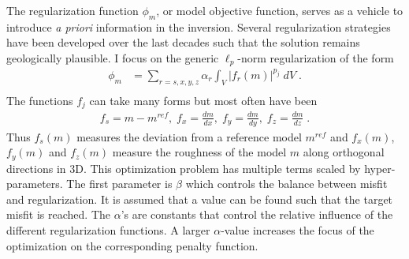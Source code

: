 The regularization function $\phi_m$, or model objective function, serves as a vehicle to introduce \emph{a priori} information in the inversion.
Several regularization strategies have been developed over the last decades such that the solution remains geologically plausible.
I focus on the generic $\ell_p$-norm regularization of the form
\begin{equation}
\begin{split}\label{intSmall}
\phi_m &= \sum_{r=s,x,y,z} \alpha_r \int_V |f_r (m)|^{p_j} \;dV\;. \\
\end{split}
\end{equation}
The functions $f_j$ can take many forms but most often have been
\begin{equation}
\begin{split}\label{fj}
f_s= m-m^{ref},\;f_x= \frac{d m}{dx},\; f_y= \frac{d m}{dy},\;f_z= \frac{d m}{dz}\;.
\end{split}
\end{equation}
Thus $f_s(m)$ measures the deviation from a reference model $m^{ref}$ and $f_x(m)$, $f_y(m)$ and $f_z(m)$ measure the roughness of the model $m$ along orthogonal directions in 3D.
This optimization problem has multiple terms scaled by hyper-parameters. The first parameter is $\beta$ which controls the balance between misfit and regularization. It is assumed that a value can be found such that the target misfit is reached.
The $\alpha$'s are constants that control the relative influence of the different regularization functions. A larger $\alpha$-value increases the focus of the optimization on the corresponding penalty function.


